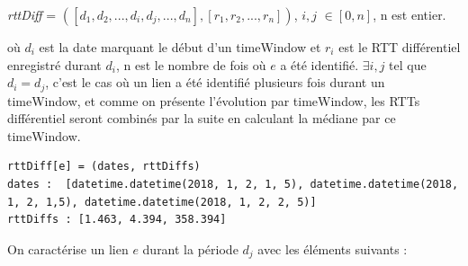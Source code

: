 \textit{rttDiff} = $ ([d_1,d_2,...,d_i, d_j, ..., d_n], [r_1, r_2, ..., r_n]) $,  $ i, j$ $ \in $$  [0,n] $, n est entier. 

où $ d_i $ est la date marquant le début d'un  timeWindow et $ r_i $ est le RTT différentiel  enregistré durant $ d_i $, n est le nombre de fois où $e$ a été identifié.  $\exists i, j $ tel que $d_i=d_j $, c'est le cas où un lien a été identifié plusieurs fois durant un timeWindow, et comme on présente l'évolution par timeWindow, les RTTs différentiel seront combinés par la suite en calculant la médiane par ce timeWindow.

\begin{lstlisting}[firstnumber=1,basicstyle=\tiny]
rttDiff[e] = (dates, rttDiffs)
dates :  [datetime.datetime(2018, 1, 2, 1, 5), datetime.datetime(2018, 1, 2, 1,5), datetime.datetime(2018, 1, 2, 2, 5)]
rttDiffs : [1.463, 4.394, 358.394]
\end{lstlisting}
On caractérise  un lien $ e $ durant la période $ d_j $ avec les éléments suivants :

